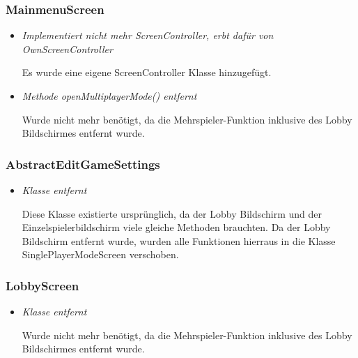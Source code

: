 \subsubsection{MainmenuScreen}
\begin{itemize}
    \item \textit{Implementiert nicht mehr ScreenController, erbt dafür von OwnScreenController}
        \begin{leftbar}[0.9\linewidth]
            Es wurde eine eigene ScreenController Klasse hinzugefügt.
        \end{leftbar}
    \item \textit{Methode openMultiplayerMode() entfernt}
        \begin{leftbar}[0.9\linewidth]
            Wurde nicht mehr benötigt, da die Mehrspieler-Funktion inklusive des 
            Lobby Bildschirmes entfernt wurde.
        \end{leftbar}
\end{itemize}

\subsubsection{AbstractEditGameSettings}
\begin{itemize}
    \item \textit{Klasse entfernt}
        \begin{leftbar}[0.9\linewidth]
            Diese Klasse existierte ursprünglich, da der Lobby Bildschirm und der 
            Einzelspielerbildschirm viele gleiche Methoden brauchten. Da der Lobby 
            Bildschirm entfernt wurde, wurden alle Funktionen hierraus in die Klasse 
            SinglePlayerModeScreen verschoben.
        \end{leftbar}
\end{itemize}

\subsubsection{LobbyScreen}
\begin{itemize}
    \item \textit{Klasse entfernt}
        \begin{leftbar}[0.9\linewidth]
            Wurde nicht mehr benötigt, da die Mehrspieler-Funktion inklusive des 
            Lobby Bildschirmes entfernt wurde.
        \end{leftbar}
\end{itemize}

